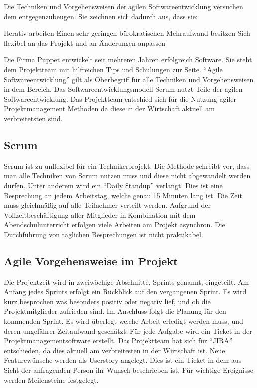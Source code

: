 Die Techniken und Vorgehensweisen der agilen Softwareentwicklung versuchen dem
entgegenzubeugen. Sie zeichnen sich dadurch aus, dass sie:

\begin{outline}
  \1 Iterativ arbeiten
  \1 Einen sehr geringen bürokratischen Mehraufwand besitzen
  \1 Sich flexibel an das Projekt und an Änderungen anpassen
\end{outline}

Die Firma Puppet entwickelt seit mehreren Jahren erfolgreich Software. Sie
steht dem Projektteam mit hilfreichen Tips und Schulungen zur Seite. ``Agile
Softwareentwicklung'' gilt als Oberbegriff für alle Techniken und
Vorgehensweisen in dem Bereich. Das Softwareentwicklungsmodell Scrum nutzt
Teile der agilen Softwareentwicklung. Das Projektteam entschied sich für die
Nutzung agiler Projektmanagement Methoden da diese in der Wirtschaft aktuell am
verbreitetsten sind.
\tm%

\subsection{Scrum}
Scrum ist zu unflexibel für ein Technikerprojekt. Die Methode schreibt vor,
dass man alle Techniken von Scrum nutzen muss und diese nicht abgewandelt
werden dürfen.  Unter anderem wird ein ``Daily Standup'' verlangt. Dies ist
eine Besprechung an jedem Arbeitstag, welche genau 15 Minuten lang ist. Die
Zeit muss gleichmäßig auf alle Teilnehmer verteilt werden. Aufgrund der
Vollzeitbeschäftigung aller Mitglieder in Kombination mit dem
Abendschulunterricht erfolgen viele Arbeiten am Projekt asynchron. Die
Durchführung von täglichen Besprechungen ist nicht
praktikabel.~\cite{scrum_talk}
\tm%

\subsection{Agile Vorgehensweise im Projekt}
\label{subsec:agile_vorgehensweise}
Die Projektzeit wird in zweiwöchige Abschnitte, Sprints genannt, eingeteilt. Am
Anfang jedes Sprints erfolgt ein Rückblick auf den vergangenen Sprint. Es wird
kurz besprochen was besonders positiv oder negativ lief, und ob die
Projektmitglieder zufrieden sind. Im Anschluss folgt die Planung für den
kommenden Sprint. Es wird überlegt welche Arbeit erledigt werden muss, und
deren ungefährer Zeitaufwand geschätzt. Für jede Aufgabe wird ein Ticket in
der Projektmanagementsoftware erstellt. Das Projektteam hat sich für ``JIRA''
entschieden, da dies aktuell am verbreitesten in der Wirtschaft ist. Neue
Featurewünsche werden als Userstory angelegt. Dies ist ein Ticket in dem aus
Sicht der anfragenden Person ihr Wunsch beschrieben ist. Für wichtige
Ereignisse werden Meilensteine festgelegt.
\tm%

